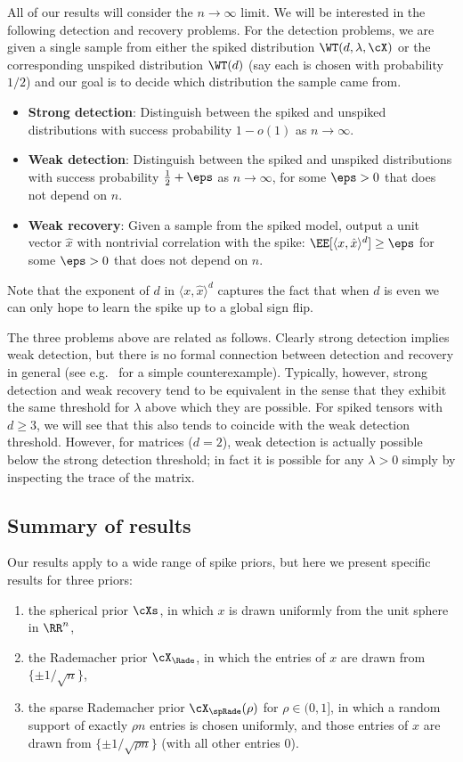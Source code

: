 \documentclass{article}
\begin{document}
All of our results will consider the $n \to \infty$ limit. We will be interested in the following detection and recovery problems. For the detection problems, we are given a single sample from either the spiked distribution $\WT(d,\lambda,\cX)$ or the corresponding unspiked distribution $\WT(d)$ (say each is chosen with probability $1/2$) and our goal is to decide which distribution the sample came from.
\begin{itemize}
\item{\bf Strong detection}: Distinguish between the spiked and unspiked distributions with success probability $1-o(1)$ as $n \to \infty$.
\item{\bf Weak detection}: Distinguish between the spiked and unspiked distributions with success probability $\frac{1}{2}+\eps$ as $n \to \infty$, for some $\eps > 0$ that does not depend on $n$.
\item{\bf Weak recovery}: Given a sample from the spiked model, output a unit vector $\hat x$ with nontrivial correlation with the spike: $\EE[\langle x,\hat x \rangle^d] \ge \eps$ for some $\eps > 0$ that does not depend on $n$.
\end{itemize}

\noindent Note that the exponent of $d$ in $\langle x,\hat x \rangle^d$ captures the fact that when $d$ is even we can only hope to learn the spike up to a global sign flip.

The three problems above are related as follows. Clearly strong detection implies weak detection, but there is no formal connection between detection and recovery in general (see e.g.\ \cite{bmvvx} for a simple counterexample). Typically, however, strong detection and weak recovery tend to be equivalent in the sense that they exhibit the same threshold for $\lambda$ above which they are possible. For spiked tensors with $d \ge 3$, we will see that this also tends to coincide with the weak detection threshold. However, for matrices ($d = 2$), weak detection is actually possible below the strong detection threshold; in fact it is possible for any $\lambda > 0$ simply by inspecting the trace of the matrix.




\subsection{Summary of results}
\label{sec:summary}

Our results apply to a wide range of spike priors, but here we present specific results for three priors:
\begin{enumerate}[label=(\roman*)]
\item the spherical prior $\cXs$, in which $x$ is drawn uniformly from the unit sphere in $\RR^n$,
\item the Rademacher prior $\cX_\Rade$, in which the entries of $x$ are drawn \iid from $\{\pm 1/\sqrt{n} \}$,
\item the sparse Rademacher prior $\cX_\spRade(\rho)$ for $\rho \in (0,1]$, in which a random support of exactly $\rho n$ entries is chosen uniformly, and those entries of $x$ are drawn \iid from $\{\pm 1/\sqrt{\rho n} \}$ (with all other entries $0$).
\end{enumerate}
\end{document}
